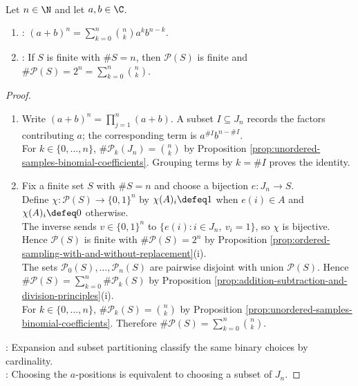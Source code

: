 \begin{proposition} \label{prop:binomial-theorem-and-subset-count} \\
Let $n\in\N$ and let $a,b\in\C$.
\begin{enumerate}[label=(\roman*)]
\setlength{\itemsep}{0pt}
\item {}: $(a+b)^n=\sum\limits_{k=0}^{n}\binom{n}{k}a^kb^{n-k}$.
\item {}: If $S$ is finite with $\#S=n$, then $\mathcal{P}(S)$ is finite and $\#\mathcal{P}(S)=2^n=\sum\limits_{k=0}^{n}\binom{n}{k}$.
\end{enumerate}
\begin{proof}
\begin{enumerate}[label=(\roman*)]
\setlength{\itemsep}{0pt}
\item Write $(a+b)^n=\prod\limits_{j=1}^{n}(a+b)$. A subset $I\subseteq J_n$ records the factors contributing $a$; the corresponding term is $a^{\#I}b^{n-\#I}$.\\
For $k\in\{0,\ldots,n\}$, $\#\mathcal{P}_k(J_n)=\binom{n}{k}$ by Proposition \ref{prop:unordered-samples-binomial-coefficients}. Grouping terms by $k=\#I$ proves the identity.
\item Fix a finite set $S$ with $\#S=n$ and choose a bijection $e:J_n\to S$.\\
Define $\chi:\mathcal{P}(S)\to\{0,1\}^n$ by $\chi(A)_i\defeq1$ when $e(i)\in A$ and $\chi(A)_i\defeq0$ otherwise.\\
The inverse sends $v\in\{0,1\}^n$ to $\{e(i):i\in J_n,\ v_i=1\}$, so $\chi$ is bijective.\\
Hence $\mathcal{P}(S)$ is finite with $\#\mathcal{P}(S)=2^n$ by Proposition \ref{prop:ordered-sampling-with-and-without-replacement}(i).\\
The sets $\mathcal{P}_0(S),\ldots,\mathcal{P}_n(S)$ are pairwise disjoint with union $\mathcal{P}(S)$. Hence $\#\mathcal{P}(S)=\sum\limits_{k=0}^{n}\#\mathcal{P}_k(S)$ by Proposition \ref{prop:addition-subtraction-and-division-principles}(i).\\
For $k\in\{0,\ldots,n\}$, $\#\mathcal{P}_k(S)=\binom{n}{k}$ by Proposition \ref{prop:unordered-samples-binomial-coefficients}. Therefore $\#\mathcal{P}(S)=\sum\limits_{k=0}^{n}\binom{n}{k}$.
\end{enumerate}
: Expansion and subset partitioning classify the same binary choices by cardinality.\\
: Choosing the $a$-positions is equivalent to choosing a subset of $J_n$.
\end{proof}
\end{proposition}

